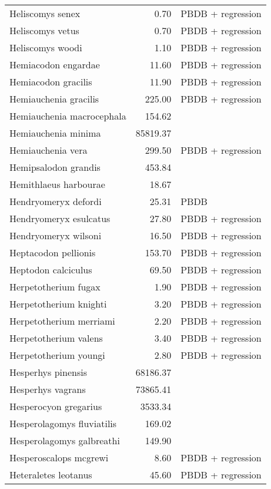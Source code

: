 \begin{table}[ht]
\begin{tabular}{lrl}
  Heliscomys senex & 0.70 & PBDB + regression \\ 
  Heliscomys vetus & 0.70 & PBDB + regression \\ 
  Heliscomys woodi & 1.10 & PBDB + regression \\ 
  Hemiacodon engardae & 11.60 & PBDB + regression \\ 
  Hemiacodon gracilis & 11.90 & PBDB + regression \\ 
  Hemiauchenia gracilis & 225.00 & PBDB + regression \\ 
  Hemiauchenia macrocephala & 154.62 & \cite{Smith2004} \\ 
  Hemiauchenia minima & 85819.37 & \cite{Tomiya2013} \\ 
  Hemiauchenia vera & 299.50 & PBDB + regression \\ 
  Hemipsalodon grandis & 453.84 & \cite{Scott1937} \\ 
  Hemithlaeus harbourae & 18.67 & \cite{Loomis1932} \\ 
  Hendryomeryx defordi & 25.31 & PBDB \\ 
  Hendryomeryx esulcatus & 27.80 & PBDB + regression \\ 
  Hendryomeryx wilsoni & 16.50 & PBDB + regression \\ 
  Heptacodon pellionis & 153.70 & PBDB + regression \\ 
  Heptodon calciculus & 69.50 & PBDB + regression \\ 
  Herpetotherium fugax & 1.90 & PBDB + regression \\ 
  Herpetotherium knighti & 3.20 & PBDB + regression \\ 
  Herpetotherium merriami & 2.20 & PBDB + regression \\ 
  Herpetotherium valens & 3.40 & PBDB + regression \\ 
  Herpetotherium youngi & 2.80 & PBDB + regression \\ 
  Hesperhys pinensis & 68186.37 & \cite{Tomiya2013} \\ 
  Hesperhys vagrans & 73865.41 & \cite{Tomiya2013} \\ 
  Hesperocyon gregarius & 3533.34 & \cite{Tomiya2013} \\ 
  Hesperolagomys fluviatilis & 169.02 & \cite{Tomiya2013} \\ 
  Hesperolagomys galbreathi & 149.90 & \cite{Tomiya2013} \\ 
  Hesperoscalops mcgrewi & 8.60 & PBDB + regression \\ 
  Heteraletes leotanus & 45.60 & PBDB + regression \\ 

\end{tabular}
\end{table}
